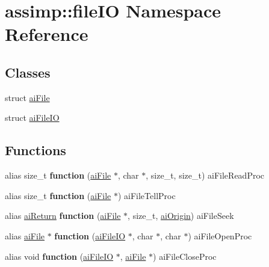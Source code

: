 \hypertarget{namespaceassimp_1_1file_i_o}{\section{assimp\+:\+:file\+I\+O Namespace Reference}
\label{namespaceassimp_1_1file_i_o}
}
\subsection*{Classes}
\begin{DoxyCompactItemize}
\item 
struct \hyperlink{structassimp_1_1file_i_o_1_1ai_file}{ai\+File}
\item 
struct \hyperlink{structassimp_1_1file_i_o_1_1ai_file_i_o}{ai\+File\+I\+O}
\end{DoxyCompactItemize}
\subsection*{Functions}
\begin{DoxyCompactItemize}
\item 
\hypertarget{namespaceassimp_1_1file_i_o_ae935201af1aa6ca18db7ed71b31e202a}{alias size\+\_\+t {\bfseries function} (\hyperlink{structassimp_1_1file_i_o_1_1ai_file}{ai\+File} $\ast$, char $\ast$, size\+\_\+t, size\+\_\+t) ai\+File\+Read\+Proc}\label{namespaceassimp_1_1file_i_o_ae935201af1aa6ca18db7ed71b31e202a}

\item 
\hypertarget{namespaceassimp_1_1file_i_o_a3413774a3e9b73743093d892c39dd9fa}{alias size\+\_\+t {\bfseries function} (\hyperlink{structassimp_1_1file_i_o_1_1ai_file}{ai\+File} $\ast$) ai\+File\+Tell\+Proc}\label{namespaceassimp_1_1file_i_o_a3413774a3e9b73743093d892c39dd9fa}

\item 
\hypertarget{namespaceassimp_1_1file_i_o_a5e06b8c129d5bbcbd5db89c29cd32c9f}{alias \hyperlink{namespaceassimp_1_1types_ac24c8c8413fff5748d90ed5ac59f36ec}{ai\+Return} {\bfseries function} (\hyperlink{structassimp_1_1file_i_o_1_1ai_file}{ai\+File} $\ast$, size\+\_\+t, \hyperlink{namespaceassimp_1_1types_a1fe9ed8ac4719b58cb780da43ff011e2}{ai\+Origin}) ai\+File\+Seek}\label{namespaceassimp_1_1file_i_o_a5e06b8c129d5bbcbd5db89c29cd32c9f}

\item 
\hypertarget{namespaceassimp_1_1file_i_o_acd14c025eda38db3dc2a16505284e871}{alias \hyperlink{structassimp_1_1file_i_o_1_1ai_file}{ai\+File} $\ast$ {\bfseries function} (\hyperlink{structassimp_1_1file_i_o_1_1ai_file_i_o}{ai\+File\+I\+O} $\ast$, char $\ast$, char $\ast$) ai\+File\+Open\+Proc}\label{namespaceassimp_1_1file_i_o_acd14c025eda38db3dc2a16505284e871}

\item 
\hypertarget{namespaceassimp_1_1file_i_o_adf0ac6eeafc434abac94d68603aa54a9}{alias void {\bfseries function} (\hyperlink{structassimp_1_1file_i_o_1_1ai_file_i_o}{ai\+File\+I\+O} $\ast$, \hyperlink{structassimp_1_1file_i_o_1_1ai_file}{ai\+File} $\ast$) ai\+File\+Close\+Proc}\label{namespaceassimp_1_1file_i_o_adf0ac6eeafc434abac94d68603aa54a9}

\end{DoxyCompactItemize}
